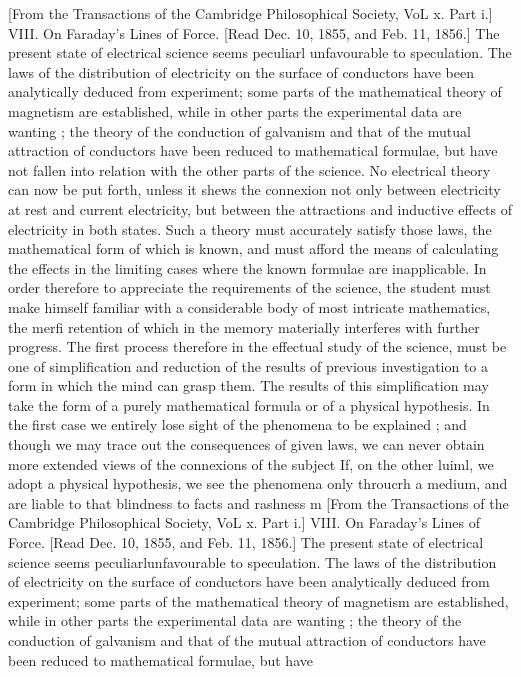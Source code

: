 \documentclass[a4paper,11pt]{book}
\begin{document}
[From the Transactions of the Cambridge Philosophical Society, VoL x. Part i.]
VIII. On Faraday's Lines of Force.
[Read Dec. 10, 1855, and Feb. 11, 1856.]
The present state of electrical science seems peculiarl unfavourable to speculation.
The laws of the distribution of electricity on the surface of conductors
have been analytically deduced from experiment; some parts of the mathematical
theory of magnetism are established, while in other parts the experimental data
are wanting ; the theory of the conduction of galvanism and that of the mutual
attraction of conductors have been reduced to mathematical formulae, but have
not fallen into relation with the other parts of the science. No electrical theory
can now be put forth, unless it shews the connexion not only between electricity
at rest and current electricity, but between the attractions and inductive effects
of electricity in both states. Such a theory must accurately satisfy those laws,
the mathematical form of which is known, and must afford the means of calculating
the effects in the limiting cases where the known formulae are inapplicable.
In order therefore to appreciate the requirements of the science, the student
must make himself familiar with a considerable body of most intricate mathematics,
the merfi retention of which in the memory materially interferes with
further progress. The first process therefore in the effectual study of the science,
must be one of simplification and reduction of the results of previous investigation
to a form in which the mind can grasp them. The results of this simplification
may take the form of a purely mathematical formula or of a physical
hypothesis. In the first case we entirely lose sight of the phenomena to be
explained ; and though we may trace out the consequences of given laws, we
can never obtain more extended views of the connexions of the subject If,
on the other luiml, we adopt a physical hypothesis, we see the phenomena only
throucrh a medium, and are liable to that blindness to facts and rashness m
[From the Transactions of the Cambridge Philosophical Society, VoL x. Part i.]
VIII. On Faraday's Lines of Force.
[Read Dec. 10, 1855, and Feb. 11, 1856.]
The present state of electrical science seems peculiarlunfavourable to speculation.
The laws of the distribution of electricity on the surface of conductors
have been analytically deduced from experiment; some parts of the mathematical
theory of magnetism are established, while in other parts the experimental data
are wanting ; the theory of the conduction of galvanism and that of the mutual
attraction of conductors have been reduced to mathematical formulae, but have
\end{document}
